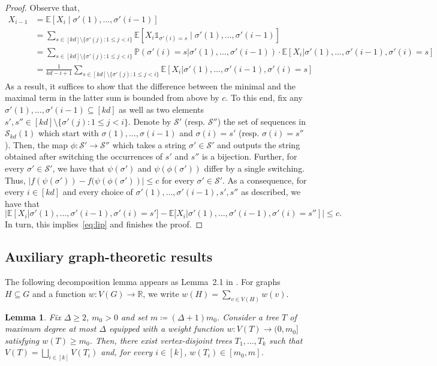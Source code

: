 \documentclass[reqno,final,a4paper]{amsart}
\newtheorem{lemma}[thm]{Lemma}
\theoremstyle{definition}
\newcommand{\cS}{\mathcal{S}}
\newcommand{\1}{\mathbbm{1}}
\begin{document}
\begin{proof}
Observe that, 
\begin{align*}
    X_{i-1}
    &=\mathbb E[X_i\mid \sigma'(1),...,\sigma'(i-1)]\\
    &=\sum_{s\in [kd]\setminus \{\sigma'(j):1\leq j<i\}}\mathbb E[X_i\mathds{1}_{\sigma'(i)=s}\mid \sigma'(1),...,\sigma'(i-1)]\\
    &=\sum_{s \in [kd]\setminus \{\sigma'(j):1\leq j<i\}} \mathbb P(\sigma'(i)=s|\sigma'(1),...,\sigma'(i-1))\cdot\mathbb E[X_i|\sigma'(1),...,\sigma'(i-1),\sigma'(i)=s]\\
    &=\frac{1}{kd-i+1}\sum_{s \in [kd]\setminus \{\sigma'(j):1\leq j<i\}} \mathbb E[X_i|\sigma'(1),...,\sigma'(i-1),\sigma'(i)=s]
\end{align*}
As a result, it suffices to show that the difference between the minimal and the maximal term in the latter sum is bounded from above by $c$.
To this end, fix any $\sigma'(1),\ldots,\sigma'(i-1)\subseteq [kd]$ as well as two elements $s',s''\in [kd]\setminus \{\sigma'(j):1\leq j<i\}$. Denote by $\cS'$ (resp. $\cS''$) the set of sequences in $\cS_{kd}(1)$ which start with $\sigma(1),\ldots,\sigma(i-1)$ and $\sigma(i)=s'$ (resp. $\sigma(i)=s''$). Then, the map $\phi: \cS'\to \cS''$ which takes a string $\sigma'\in\cS'$ and outputs the string obtained after switching the occurrences of $s'$ and $s''$ is a bijection. 
Further, for every $\sigma'\in \cS'$, we have that $\psi(\sigma')$ and $\psi(\phi(\sigma'))$ differ by a single switching. Thus,  $|f(\psi(\sigma'))-f(\psi(\phi(\sigma'))|\le c$ for every $\sigma'\in \cS'$.  
As a consequence, for every $i\in [kd]$ and every choice of $\sigma'(1),\ldots,\sigma'(i-1),s',s''$ as described, we have that $$|\mathbb E[X_i|\sigma'(1),...,\sigma'(i-1),\sigma'(i)=s']-\mathbb E[X_i|\sigma'(1),...,\sigma'(i-1),\sigma'(i)=s'']|\le c.$$
In turn, this implies~\eqref{eq:lip} and finishes the proof.
\end{proof}

\subsection{Auxiliary graph-theoretic results} The following decomposition lemma appears as Lemma~2.1 in \cite{ADILS25}.
For graphs $H\subseteq G$ and a function $w:V(G)\to \mathbb R$, we write $w(H)=\sum_{v\in V(H)} w(v)$.

\begin{lemma}\label{l: decomps}
Fix $\Delta \ge 2$, $m_0>0$ and set $m \coloneqq(\Delta+1)m_0$. 
Consider a tree $T$ of maximum degree at most $\Delta$ equipped with a weight function $w:V(T)\to (0,m_0]$ satisfying $w(T)\ge m_0$. Then, there exist vertex-disjoint trees $T_1,\ldots, T_k$ such that $V(T)=\bigsqcup_{i\in[k]} V(T_i)$ and, for every $i\in [k]$, $w(T_i)\in [m_0, m]$. 
\end{lemma}
\end{document}
